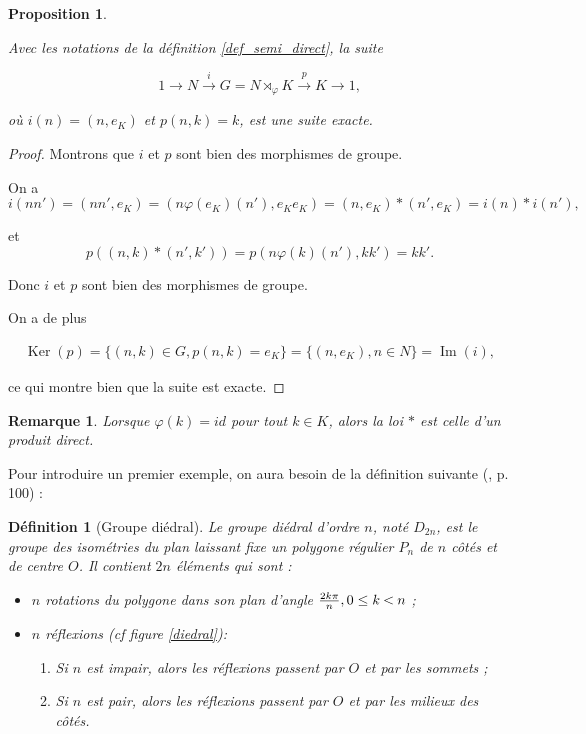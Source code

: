 \documentclass[french]{report}
\newtheorem{prop}{Proposition}[section]
\newtheorem{definition}{Définition}[section]
\newtheorem*{remark}{Remarque}
\newcommand{\lesss}{\rotatebox[origin=c]{90}{$\land$}}
\newcommand{\less}{\ \lesss\ }
\begin{document}
\begin{prop}\label{injection_projection}

  Avec les notations de la définition \ref{def_semi_direct}, la suite

  $$ 1 \longrightarrow N \stackrel{i}{\longrightarrow} G = N \rtimes _{\varphi} K \stackrel{p}{\longrightarrow} K \longrightarrow 1, $$

  où $i(n)=(n,e_K)$ et $p(n,k) = k$, est une suite exacte.
\end{prop}

\begin{proof}
Montrons que $i$ et $p$ sont bien des morphismes de groupe.

On a $$ i(nn') = (nn', e_K)= (n \varphi(e_K)(n'), e_K e_K) = (n, e_K) * (n', e_K) = i(n) * i(n'),$$

et $$ p((n, k)*(n',k')) = p( n \varphi(k)(n'), k k' ) = k k'.$$

Donc $i$ et $p$ sont bien des morphismes de groupe.

On a de plus

\begin{gather*}
  \operatorname{Ker}(p) = \{ (n, k) \in G, p(n, k) =e_K\} = \{ (n, e_K), n \in N \} = \operatorname{Im}(i),
\end{gather*}

ce qui montre bien que la suite est exacte.
\end{proof}

\begin{remark}
Lorsque $\varphi(k) = id$ pour tout $k \in K$, alors la loi $*$ est celle d'un produit direct.
\end{remark}

Pour introduire un premier exemple, on aura besoin de la définition suivante (\cite{maclane}, p. 100) :

\begin{definition}[Groupe diédral]
  Le groupe diédral d'ordre $n$, noté $D _{2n}$, est le groupe des isométries du plan laissant fixe un polygone régulier $P_n$ de $n$ côtés et de centre $O$. Il contient $2n$ éléments qui sont :
  \begin{itemize}
    \item $n$ rotations du polygone dans son plan d'angle $\frac{2k \pi}{n}, 0 \leq k \less n$ ;
    \item $n$ réflexions (cf figure \ref{diedral}):
    \begin{enumerate}
      \item Si $n$ est impair, alors les réflexions passent par $O$ et par les sommets ;
      \item Si $n$ est pair, alors les réflexions passent par $O$ et par les milieux des côtés.
    \end{enumerate}
  \end{itemize}
\end{definition}
\end{document}
